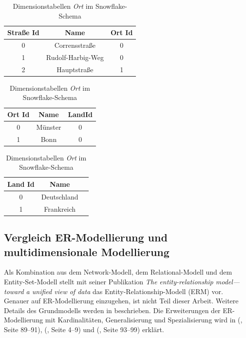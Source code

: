 \documentclass[
  language=german, %
  type=bachelor,%
  ngerman
]{isthesis}
\begin{document}
\begin{content}
  \begin{table}
    \footnotesize
    \begin{tabular}[t]{c c c }
      Straße Id & Name & Ort Id \\
      \toprule
      0 & Corrensstraße & 0 \\
      1 & Rudolf-Harbig-Weg & 0 \\
      2 & Hauptstraße & 1 \\
    \end{tabular}
		\hfill
    \begin{tabular}[t]{c c c}
      Ort Id & Name & LandId \\
      \toprule
      0 & Münster & 0 \\
      1 & Bonn & 0 \\
    \end{tabular}
		\hfill
    \begin{tabular}[t]{c c c }
      Land Id & Name \\
      \toprule
      0 & Deutschland \\
      1 & Frankreich \\
    \end{tabular}
    \caption{Dimensionstabellen \textit{Ort} im Snowflake-Schema}\label{table:dimension-table-snow}
  \end{table}

  \subsection{Vergleich \acrshort{ER}-Modellierung und multidimensionale Modellierung}

	Als Kombination aus dem Network-Modell, dem Relational-Modell und dem
	Entity-Set-Modell stellt \textsc{\citeauthor{chen1976entity}}
	\citeyear{chen1976entity} mit seiner Publikation \textit{\glqq{}The
	entity-relationship model—toward a unified view of data\grqq{}} das
  Entity-Relationship-Modell (\acrshort{ERM}) vor.  Genauer auf \acrshort{ER}-Modellierung einzugehen, ist
	nicht Teil dieser Arbeit. Weitere Details des Grundmodells werden in
	\textsc{\cite{chen1976entity}} beschrieben. Die Erweiterungen der
	ER-Modellierung mit Kardinalitäten, Generalisierung und Spezialisierung wird
	in \textsc{\citeauthor{becker2004handelsinformationssysteme}}
	(\citeyear{becker2004handelsinformationssysteme}, Seite 89--91),
	\textsc{\citeauthor{becker2012grundsatze}} (\citeyear{becker2012grundsatze},
	Seite 4--9) und \textsc{\citeauthor{schutte2013grundsatze}}
	(\citeyear{schutte2013grundsatze}, Seite 93--99) erklärt.


\end{content}
\end{document}
